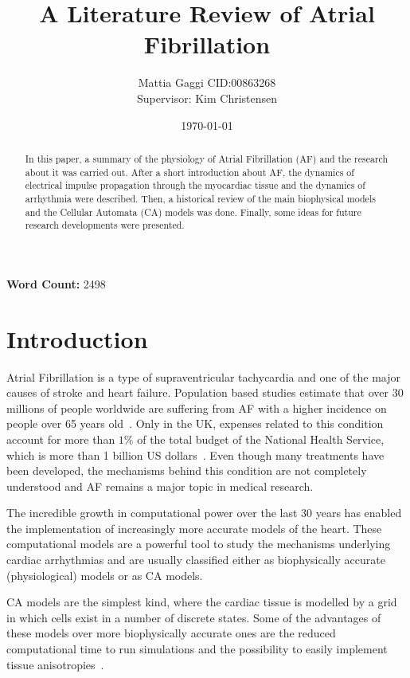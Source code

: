 \documentclass{article}
\title{A Literature Review of Atrial Fibrillation}
\author{ Mattia Gaggi CID:00863268\\
 \vspace{0.2cm}
Supervisor: Kim Christensen}
\date{\today}
\begin{document}
\maketitle
\vspace{-0.65cm}
\centerline{\textbf{Word Count:} 2498}
\begin{abstract}
In this paper, a summary of the physiology of Atrial Fibrillation (AF) and the research about it was carried out. After a short introduction about AF, the dynamics of electrical impulse propagation through the myocardiac tissue and the dynamics of arrhythmia were described. Then, a historical review of the main biophysical models and the Cellular Automata (CA) models was done. Finally, some ideas for future research developments were presented.
\end{abstract}

\vspace{0.2cm}



\vspace{0.2cm}

\section{Introduction}




Atrial Fibrillation is a type of supraventricular tachycardia and one of the major causes of stroke and heart failure. Population based studies estimate that over 30 millions of people worldwide are suffering from AF with a higher incidence on people over 65 years old~\cite{stats_af}. 
Only in the UK, expenses related to this condition account for more than $1\%$ of the total budget of the National Health Service, which is more than 1 billion US dollars~\cite{stats_health}. Even though many treatments have been developed, the mechanisms behind this condition are not completely understood and AF remains a major topic in medical research. 


The incredible growth in computational power over the last 30 years has enabled the implementation of increasingly more accurate models of the heart.  These computational models are a powerful tool to study the mechanisms underlying cardiac arrhythmias and are usually classified either as biophysically accurate (physiological) models or as CA models. 

CA models are the simplest kind, where the cardiac tissue is modelled by a grid in which cells exist in a number of discrete states. Some of the advantages of these models over more biophysically accurate ones are the reduced computational time to run simulations and the possibility to easily implement tissue anisotropies~\cite{kim2015}. 
\end{document}
